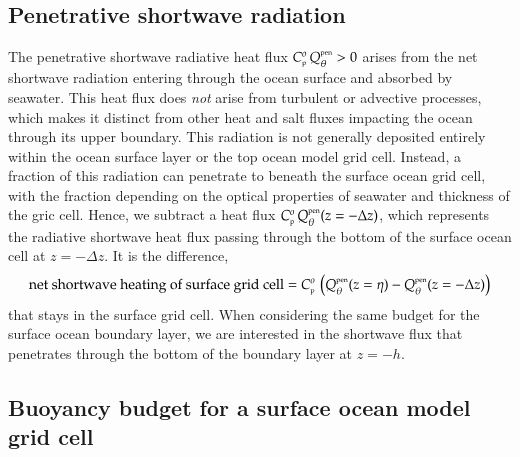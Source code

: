 \subsection{Penetrative shortwave radiation} 
\label{subsection:pen-buoyancy-fluxes}

The penetrative shortwave radiative heat flux $C_{\mbox{\tiny p}}^{o}
\, Q_{\theta}^{\mbox{\tiny pen}} > 0$ arises from the net shortwave
radiation entering through the ocean surface and absorbed by seawater.
This heat flux does {\it not} arise from turbulent or advective
processes, which makes it distinct from other heat and salt fluxes
impacting the ocean through its upper boundary.  This radiation is not
generally deposited entirely within the ocean surface layer or the top
ocean model grid cell. Instead, a fraction of this radiation can
penetrate to beneath the surface ocean grid cell, with the fraction
depending on the optical properties of seawater and thickness of the
gric cell.  Hence, we subtract a heat flux $C_{\mbox{\tiny p}}^{o} \,
Q_{\theta}^{\mbox{\tiny pen}}(z=-\Delta z)$, which represents the
radiative shortwave heat flux passing through the bottom of the
surface ocean cell at $z=-\Delta z$.  It is the difference,
\begin{equation}
   \mbox{net shortwave heating of surface grid cell} = 
  C_{\mbox{\tiny p}}^{o} \, \left( Q_{\theta}^{\mbox{\tiny pen}}(z=\eta) 
                    -Q_{\theta}^{\mbox{\tiny pen}}(z=-\Delta z) \right)
\end{equation}
that stays in the surface grid cell.  When considering the same budget
for the surface ocean boundary layer, we are interested in the
shortwave flux that penetrates through the bottom of the boundary
layer at $z=-h$.


\subsection{Buoyancy budget for a surface ocean model grid cell}

